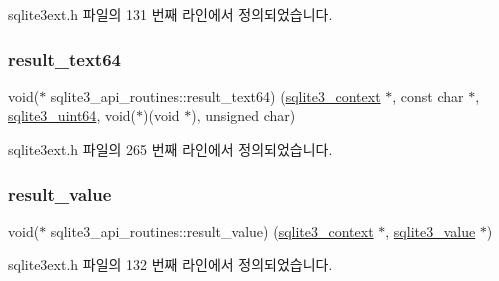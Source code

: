 sqlite3ext.\+h 파일의 131 번째 라인에서 정의되었습니다.

\mbox{\label{structsqlite3__api__routines_af2a0506a21f0c52b06d1104af25b1555}} 
\subsubsection{\texorpdfstring{result\+\_\+text64}{result\_text64}}
{\footnotesize\ttfamily void($\ast$ sqlite3\+\_\+api\+\_\+routines\+::result\+\_\+text64) (\hyperlink{sqlite3_8h_a3b519553ffec8fc42b2356f5b1ebdc57}{sqlite3\+\_\+context} $\ast$, const char $\ast$, \hyperlink{sqlite3_8h_a181c20ecfd72bc6627635746d382c610}{sqlite3\+\_\+uint64}, void($\ast$)(void $\ast$), unsigned char)}



sqlite3ext.\+h 파일의 265 번째 라인에서 정의되었습니다.

\mbox{\label{structsqlite3__api__routines_a077437fd729730e66afab9eb487ca10c}} 
\subsubsection{\texorpdfstring{result\+\_\+value}{result\_value}}
{\footnotesize\ttfamily void($\ast$ sqlite3\+\_\+api\+\_\+routines\+::result\+\_\+value) (\hyperlink{sqlite3_8h_a3b519553ffec8fc42b2356f5b1ebdc57}{sqlite3\+\_\+context} $\ast$, \hyperlink{sqlite3_8h_ac2fa1ecdb2290d9af6010edbd1cbc83c}{sqlite3\+\_\+value} $\ast$)}



sqlite3ext.\+h 파일의 132 번째 라인에서 정의되었습니다.

\mbox{\label{structsqlite3__api__routines_a9bd6a486d3a06555e019e02ab269439c}} 
